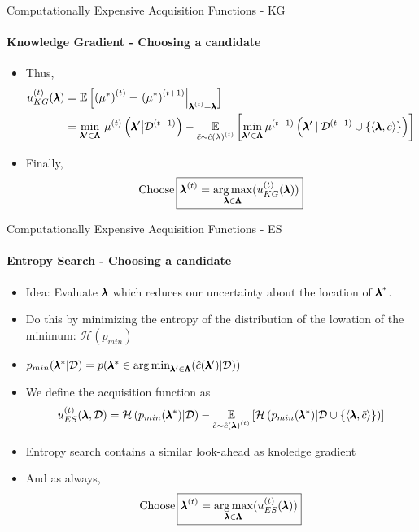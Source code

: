 \begin{frame}[c]{Computationally Expensive Acquisition Functions - KG}
\framesubtitle{Knowledge Gradient - Choosing a candidate}
\begin{itemize}\belowdisplayskip=1.5em
    
    \item<+-> Thus,
    \[
    \begin{split}
        \iter{\acq}_{KG}(\conf) 
        &= \E\left[ \iter{\left(\mean^*\right)} - \left. \iter[\bocount+1]{\left(\mean^*\right)} \right|_{\bonextsample=\conf} \right]\\
        &=\min_{\conf'\in\pcs} \, \iter{\mean} \left(\conf' \big| \iter[\bocount-1]{\dataset} \right)
        - \E_{\tilde{\cost} \sim \iter[\bocount]{\surro(\lambda)}}
        \left[\min_{\conf'\in\pcs}\iter[\bocount+1]{\mean}\left(\conf'\given{\iter[\bocount-1]{\dataset} \cup \left\{\left\langle\conf, \tilde{\cost} \right\rangle \right\}}\right)\right]
    \end{split}
    \]
    
    \item<+-> Finally, 
    \[
    \text{Choose}\,\boxed{\bonextsample = \argmax_{\conf\in\pcs}(\iter{\acq}_{KG}(\conf))}
    \]
\end{itemize}
\end{frame}
\begin{frame}[c]{Computationally Expensive Acquisition Functions - ES}
\framesubtitle{Entropy Search - Choosing a candidate}
\begin{itemize}
    \item<+-> Idea: Evaluate $\conf$ which reduces our uncertainty about the location of $\optconf$.
    \item<+-> Do this by minimizing the entropy of the distribution of the lowation of the minimum: $\mathcal{H}(p_{min})$
    \item<+-> $p_{min}(\conf^*|\dataset) = p(\conf^* \in \argmin_{\conf' \in \pcs} (\surro(\conf') | \dataset))$
    \item<+-> We define the acquisition function as 
    \[
    \begin{split}
      \iter{\acq}_{ES}(\conf,\dataset) = \mathcal{H}\left(p_{min}(\conf^*)|\dataset \right) - \E_{\tilde{\cost} \sim \iter[\bocount]{\surro(\conf)}}\left[\mathcal{H} \left( p_{min}(\conf^*)|\dataset \cup \left\{ \left\langle \conf, \tilde{\cost} \right\rangle \right\} \right)\right]
    \end{split}
    \]
    \item<+-> Entropy search contains a similar look-ahead as knoledge gradient
    \item<+-> And as always, 
    \[
    \text{Choose}\,\boxed{\bonextsample = \argmax_{\conf\in\pcs}(\iter{\acq}_{ES}(\conf))}
    \]
\end{itemize}
\end{frame}
